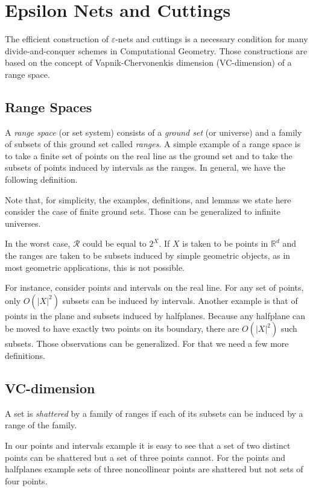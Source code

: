 \section{Epsilon Nets and Cuttings}%
\label{sec:divide-and-conquer:epsilon-nets-and-cuttings}

The efficient construction of \(\varepsilon\)-nets and cuttings
is a necessary condition for many divide-and-conquer schemes
in Computational Geometry.
%
Those constructions are based on the concept
of Vapnik-Chervonenkis dimension
(VC-dimension) of a range space.

\subsection{Range Spaces}

A \emph{range space} (or set system) consists of a \emph{ground set} (or universe) and a family of
subsets of this ground set called \emph{ranges}.
%
A simple example of a range space is to take a finite set of points on the real
line as the ground set and to take the subsets of points induced by intervals
as the ranges.
%
In general, we have the following definition.
%

%
Note that, for simplicity, the examples, definitions, and lemmas
we state here consider the case of finite
ground sets. Those can be generalized to infinite universes.

In the worst case, \(\mathcal{R}\) could be equal to \(2^{X}\).
%
If \(X\) is taken to be points in \(\mathbb{R}^d\) and the ranges are taken to
be subsets induced by simple geometric objects, as in most geometric
applications, this is not possible.

For instance, consider points and intervals on the real line.
For any set of points, only \(O({| X |}^2)\) subsets can be induced by
intervals.
%
Another example is that of points in the
plane and subsets induced by halfplanes. Because any halfplane can be moved to
have exactly two points on its boundary, there are \(O({| X |}^2)\) such subsets.
%
Those observations can be generalized. For that we need a few more definitions.

\subsection{VC-dimension}

A set is \emph{shattered} by a family of ranges if each of its subsets can be induced by a
range of the family.

%
In our points and intervals example it is easy to see that a set of two
distinct points
can be shattered but a set of three points cannot.
%
For the points and halfplanes example sets of three noncollinear points are
shattered but not sets of four points.

